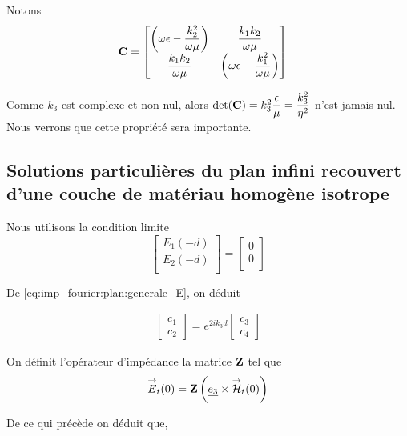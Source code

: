 Notons
\begin{align}
    \mathbf{C} &=
    \begin{bmatrix}
        \left(\omega\epsilon-\dfrac{k_2^2}{\omega\mu}\right) & \dfrac{k_1k_2}{\omega\mu}\\
        \dfrac{k_1k_2}{\omega\mu} & \left(\omega\epsilon-\dfrac{k_1^2}{\omega\mu}\right)
    \end{bmatrix}
\end{align}

Comme $k_3$ est complexe et non nul, alors $\det(\mathbf{C}) = k_3^2\dfrac{\epsilon}{\mu}=\dfrac{k_3^2}{\eta^2}$ n'est jamais nul. Nous verrons que cette propriété sera importante.

\subsection{Solutions particulières du plan infini recouvert d'une couche de matériau homogène isotrope}

Nous utilisons la condition limite 
\begin{equation}
    \begin{bmatrix}
        E_1(-d)\\
        E_2(-d)\\
    \end{bmatrix}
    =
    \begin{bmatrix}
        0\\
        0\\
    \end{bmatrix}
\end{equation}

De \eqref{eq:imp_fourier:plan:generale_E}, on déduit

\begin{align}
    \begin{bmatrix}
        c_1 \\
        c_2
    \end{bmatrix}
    = e^{2ik_3 d}
    \begin{bmatrix}
        c_3 \\
        c_4
    \end{bmatrix}
\end{align}

On définit l'opérateur d'impédance la matrice $\mathbf{Z}$ tel que 
\begin{equation}
    {\overset{\rightarrow}{E}}_t(0) = \mathbf{Z} \left(\underline{e_3} \times {\overset{\rightarrow}{\mathcal{H}}}_t(0)\right)
\end{equation}

De ce qui précède on déduit que,

